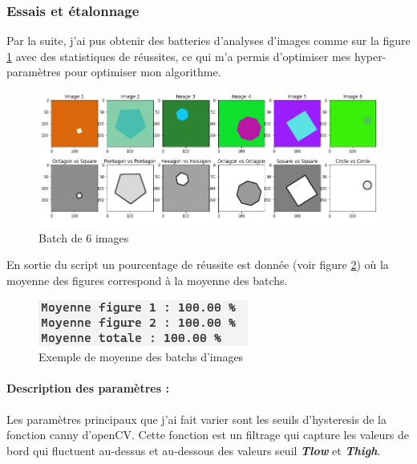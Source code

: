 	
	\subsubsection{Essais et étalonnage}
	Par la suite, j'ai pus obtenir des batteries d'analyses d'images comme sur la figure \ref{fig:batchexemple} avec des statistiques de réussites, ce qui m'a permis d'optimiser mes hyper-paramètres pour optimiser mon algorithme.
	\begin{figure}[h]
		\centering
		\includegraphics[width=\textwidth]{Figures/BatchExemple}
		\caption{Batch de 6 images}
		\label{fig:batchexemple}
	\end{figure}
	
	En sortie du script un pourcentage de réussite est donnée (voir figure \ref{fig:moyennebatchs}) où la moyenne des figures correspond à la moyenne des batchs.
	
	\begin{figure}[h]
		\centering
		\includegraphics[width=0.5\linewidth]{Figures/MoyenneBatchs}
		\caption{Exemple de moyenne des batchs d'images}
		\label{fig:moyennebatchs}
	\end{figure}
	
	
	\paragraph{Description des paramètres : } Les paramètres principaux que j'ai fait varier sont les seuils d'hysteresis de la fonction canny d'openCV. Cette fonction est un filtrage qui capture les valeurs de bord qui fluctuent au-dessus et au-dessous des valeurs seuil \textbf{\textit{Tlow}} et \textbf{\textit{Thigh}}.
	
